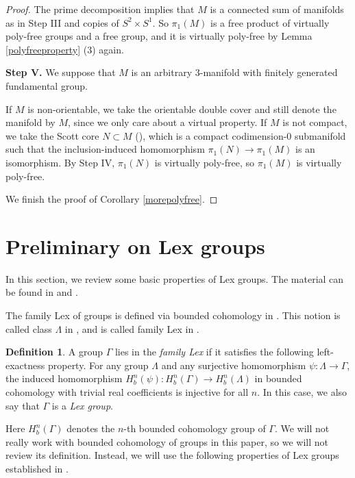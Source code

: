 \documentclass{amsart}
\numberwithin{equation}{section}
\theoremstyle{definition}
\newtheorem{definition}[theorem]{Definition}
\begin{document}
\begin{proof}
The prime decomposition implies that $M$ is a connected sum of manifolds as in Step III and copies of $S^2\times S^1$. So $\pi_1(M)$ is a free product of virtually poly-free groups and a free group, and it is virtually poly-free by Lemma \ref{polyfreeproperty} (3) again.

{\bf Step V.} We suppose that $M$ is an arbitrary $3$-manifold with finitely generated fundamental group. 

If $M$ is non-orientable, we take the orientable double cover and still denote the manifold by $M$, since we only care about a virtual property. If $M$ is not compact, we take the Scott core $N\subset M$ (\cite{Sco}), which is a compact codimension-$0$ submanifold such that the inclusion-induced homomorphism $\pi_1(N)\to \pi_1(M)$ is an isomorphism. By Step IV, $\pi_1(N)$ is virtually poly-free, so $\pi_1(M)$ is virtually poly-free.

We finish the proof of Corollary \ref{morepolyfree}.
\end{proof}


\section{Preliminary on Lex groups}\label{lexbasics}

In this section, we review some basic properties of Lex groups. The material can be found in \cite{Bou} and \cite{FLM}.

The family Lex of groups is defined via bounded cohomology in \cite{Bou}. This notion is called class $\Lambda$ in \cite{Bou}, and is called family Lex in \cite{FLM}. 
\begin{definition}\label{lexdef}
A group $\Gamma$ lies in the {\it family Lex} if it satisfies the following left-exactness property. For any group $\Lambda$ and any surjective homomorphism $\psi:\Lambda\to \Gamma$, the induced homomorphism $H_b^n(\psi): H_b^n(\Gamma)\to H_b^n(\Lambda)$ in bounded cohomology with trivial real coefficients is injective for all $n$. In this case, we also say that $\Gamma$ is a {\it Lex group}.
\end{definition}

Here $H_b^n(\Gamma)$ denotes the $n$-th bounded cohomology group of $\Gamma$. We will not really work with bounded cohomology of groups in this paper, so we will not review its definition. Instead, we will use the following properties of Lex groups established in \cite{Bou}.
\end{document}
